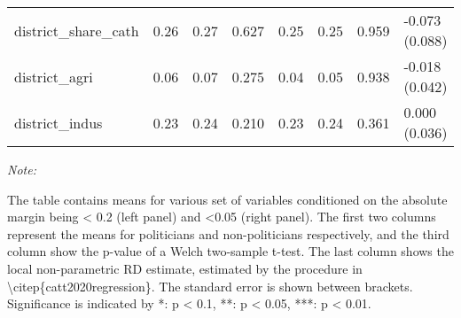 \begin{table}[!h]
\begin{threeparttable}
{\begin{tabular}[t]{llllllll}
\hspace{1em}district\_share\_cath & \num{0.26} & \num{0.27} & 0.627 & \num{0.25} & \num{0.25} & 0.959 & -0.073 (0.088)\\
\hspace{1em}district\_agri & \num{0.06} & \num{0.07} & 0.275 & \num{0.04} & \num{0.05} & 0.938 & -0.018 (0.042)\\
\hspace{1em}district\_indus & \num{0.23} & \num{0.24} & 0.210 & \num{0.23} & \num{0.24} & 0.361 & 0.000 (0.036)\\
\bottomrule
\end{tabular}}
\begin{tablenotes}
\item \textit{Note: } 
\item The table contains means for various set of variables conditioned on the absolute margin being < 0.2 (left panel) and <0.05 (right panel). The first two columns represent the means for politicians and non-politicians respectively, and the third column show the p-value of a Welch two-sample t-test. The last column shows the local non-parametric RD estimate, estimated by the procedure in \textbackslash{}citep\{catt2020regression\}. The standard error is shown between brackets. Significance is indicated by *: p < 0.1, **: p < 0.05, ***: p < 0.01.
\end{tablenotes}
\end{threeparttable}
\end{table}

